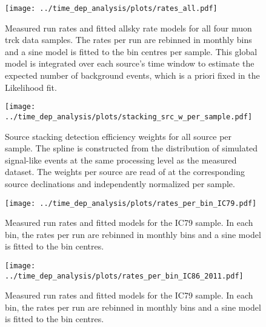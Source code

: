 \begin{figure}[H]
  \centering
  \texttt{[image: ../time\_dep\_analysis/plots/rates\_all.pdf]}
  \caption[Total run rates and sine models for all samples]{
    Measured run rates and fitted allsky rate models for all four muon trck data samples.
    The rates per run are rebinned in monthly bins and a sine model is fitted to the bin centres per sample.
    This global model is integrated over each source's time window to estimate the expected number of background events, which is a priori fixed in the Likelihood fit.
  }
  \label{fig:rates_all}
\end{figure}
\enlargethispage*{5cm}
\begin{figure}[H]
  \centering
  \texttt{[image: ../time\_dep\_analysis/plots/stacking\_src\_w\_per\_sample.pdf]}
  \caption[Source stacking weights for the time-dependent analysis]{
    Source stacking detection efficiency weights for all source per sample.
    The spline is constructed from the distribution of simulated signal-like events at the same processing level as the measured dataset.
    The weights per source are read of at the corresponding source declinations and independently normalized per sample.
  }
  \label{fig:tdep_stacking_src_w_per_sample}
\end{figure}

\begin{figure}[H]
  \centering
  \texttt{[image: ../time\_dep\_analysis/plots/rates\_per\_bin\_IC79.pdf]}
  \caption[Rate models per bin for sample IC79]{
    Measured run rates and fitted models for the IC79 sample.
    In each bin, the rates per run are rebinned in monthly bins and a sine model is fitted to the bin centres.
  }
  \label{fig:rates_per_bin_IC79}
\end{figure}

\begin{figure}[H]
  \centering
  \texttt{[image: ../time\_dep\_analysis/plots/rates\_per\_bin\_IC86\_2011.pdf]}
  \caption[Rate models per bin for sample IC86, 2011]{
    Measured run rates and fitted models for the IC79 sample.
    In each bin, the rates per run are rebinned in monthly bins and a sine model is fitted to the bin centres.
  }
  \label{fig:rates_per_bin_IC86_2011}
\end{figure}

